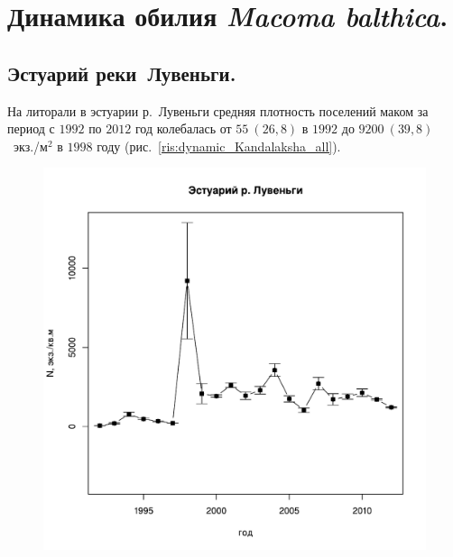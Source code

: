 	\chapter{Динамика обилия {\it Macoma balthica}.}

		\section{Эстуарий реки~Лувеньги.}


На литорали в эстуарии р.~Лувеньги средняя плотность поселений маком за период с $1992$ по $2012$ год колебалась от $55~(26,8)$ в $1992$ до $9200~(39,8)$~экз./м$^2$ в $1998$ году (рис.~\ref{ris:dynamic_Kandalaksha_all}). 
	\begin{figure}[p]
	
	\begin{minipage}[b]{.49\linewidth}
	\begin{center}
	\includegraphics[width=\linewidth]{../White_Sea/Estuatiy_Luvenga/N_dynamic1.pdf}


\end{center}
\end{minipage}
\end{figure}
